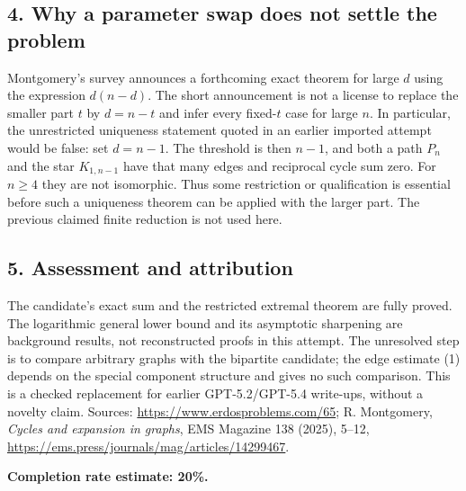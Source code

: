 \subsection*{4. Why a parameter swap does not settle the problem}
Montgomery's survey announces a forthcoming exact theorem for large $d$ using the expression $d(n-d)$. The short announcement is not a license to replace the smaller part $t$ by $d=n-t$ and infer every fixed-$t$ case for large $n$. In particular, the unrestricted uniqueness statement quoted in an earlier imported attempt would be false: set $d=n-1$. The threshold is then $n-1$, and both a path $P_n$ and the star $K_{1,n-1}$ have that many edges and reciprocal cycle sum zero. For $n\ge4$ they are not isomorphic. Thus some restriction or qualification is essential before such a uniqueness theorem can be applied with the larger part. The previous claimed finite reduction is not used here.

\subsection*{5. Assessment and attribution}
The candidate's exact sum and the restricted extremal theorem are fully proved. The logarithmic general lower bound and its asymptotic sharpening are background results, not reconstructed proofs in this attempt. The unresolved step is to compare arbitrary graphs with the bipartite candidate; the edge estimate (1) depends on the special component structure and gives no such comparison. This is a checked replacement for earlier GPT-5.2/GPT-5.4 write-ups, without a novelty claim.
Sources: \url{https://www.erdosproblems.com/65}; R. Montgomery, \emph{Cycles and expansion in graphs}, EMS Magazine 138 (2025), 5--12, \url{https://ems.press/journals/mag/articles/14299467}.

\textbf{Completion rate estimate: 20\%.}
